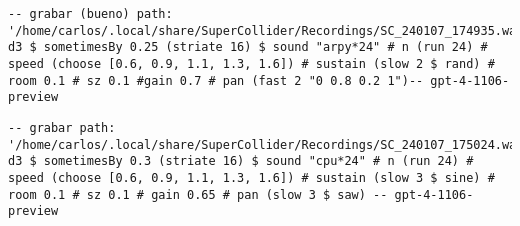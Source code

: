 \begin{minipage}[t]{1\textwidth}
    \centering
    \begin{lstlisting}[style=SuperCollider-IDE, language=ExtendedHaskell, basicstyle=\footnotesize\ttfamily, numbers=none]
-- grabar (bueno) path: '/home/carlos/.local/share/SuperCollider/Recordings/SC_240107_174935.wav'
d3 $ sometimesBy 0.25 (striate 16) $ sound "arpy*24" # n (run 24) # speed (choose [0.6, 0.9, 1.1, 1.3, 1.6]) # sustain (slow 2 $ rand) # room 0.1 # sz 0.1 #gain 0.7 # pan (fast 2 "0 0.8 0.2 1")-- gpt-4-1106-preview                                
    \end{lstlisting}
    \vspace{1cm}
\end{minipage}










\begin{minipage}[t]{1\textwidth}
    \centering
    \begin{lstlisting}[style=SuperCollider-IDE, language=ExtendedHaskell, basicstyle=\footnotesize\ttfamily, numbers=none]
-- grabar path: '/home/carlos/.local/share/SuperCollider/Recordings/SC_240107_175024.wav'
d3 $ sometimesBy 0.3 (striate 16) $ sound "cpu*24" # n (run 24) # speed (choose [0.6, 0.9, 1.1, 1.3, 1.6]) # sustain (slow 3 $ sine) # room 0.1 # sz 0.1 # gain 0.65 # pan (slow 3 $ saw) -- gpt-4-1106-preview                          
    \end{lstlisting}
    \vspace{1cm}
\end{minipage}











